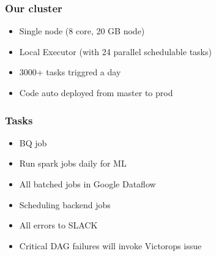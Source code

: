 \documentclass[12pt]{beamer}
\begin{document}
        \begin{frame}
            \frametitle{Our cluster}
            \begin{itemize}
                \item Single node (8 core, 20 GB node)
                \item Local Executor (with 24 parallel schedulable tasks)
                \item 3000+ tasks triggred a day
                \item Code auto deployed from master to prod
            \end{itemize}
        \end{frame}

        \begin{frame}
            \frametitle{Tasks}
            \begin{itemize}
                \item BQ job
                \item Run spark jobs daily for ML
                \item All batched jobs in Google Dataflow
                \item Scheduling backend jobs
                \item All errors to SLACK
                \item Critical DAG failures will invoke Victorops issue
            \end{itemize}
        \end{frame}
    
    
\end{document}
